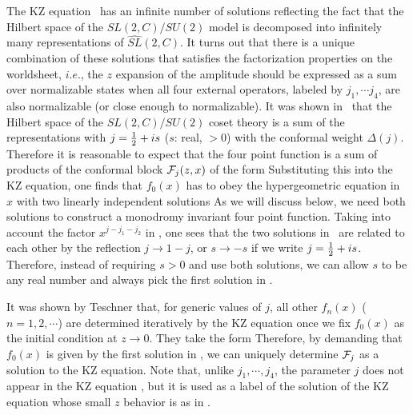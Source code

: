 %
%
%
The KZ equation \kzequation\ has an infinite number of solutions
reflecting the
fact that the Hilbert space of the $SL(2,C)/SU(2)$ model is
decomposed into infinitely many representations
of $\widehat{SL}(2,C)$. It turns out that there is
a unique combination of these solutions that satisfies
the factorization properties on the worldsheet, $i.e.$,
the $z$ expansion of the amplitude should be expressed
as a sum over normalizable states
when all four external
operators, labeled by $j_1,\cdots j_4$, are also normalizable
(or close enough to normalizable).  It was shown in
\gawedzki\
that the Hilbert space of the $SL(2,C)/SU(2)$ coset theory
is a sum of the representations with $j={1\over 2} + is$
($s$: real, $>0$) with the conformal weight $\Delta(j)$. Therefore
it is reasonable to expect that the four point function is
a sum of products of the conformal block ${\cal F}_j(z,x)$ of the form
\eqn{}
Substituting this into the KZ equation, one finds
that $f_{0}(x)$ has to obey the hypergeometric equation in $x$
with two linearly independent solutions
\eqn{}
As we will
discuss below, we need  both solutions
to construct a monodromy invariant four point function.
Taking into account
the factor $x^{j-j_1-j_2}$ in \smallz, one sees that
the two solutions in \whatf\ are related to each other by
the reflection $j \rightarrow 1-j$, or $s \rightarrow -s$
if we write $j={1\over 2} + is$. Therefore, instead of
requiring $s > 0$ and use both solutions, we can allow
$s$ to be any real number and always pick the first
solution in \whatf.



It was shown by Teschner that,
for generic values of $j$, all other $f_n(x)$
($n=1,2,\cdots$) are determined iteratively by the KZ equation
once we fix $f_0(x)$ as the initial condition at $z \rightarrow 0$.
They take the form
\eqn{}
Therefore, by demanding that $f_0(x)$
is given by the first solution in \whatf, we can
uniquely determine
${\cal F}_j$ as a solution to the KZ equation.
Note that, unlike $j_1,\cdots , j_4$, the parameter $j$ does not
appear in the KZ equation
\kzequation, but it is used as a label of the solution of the KZ
equation whose small $z$ behavior is as in \smallz .

